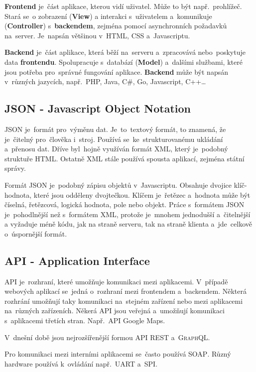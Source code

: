 \documentclass[14pt,a4paper]{article}
\begin{document}
        \textbf{Frontend} je~část aplikace, kterou vidí uživatel. Může to být např.~prohlížeč. Stará se~o zobrazení (\textbf{View}) a interakci s~uživatelem a~komunikuje (\textbf{Controller}) s~\textbf{backendem}, zejména pomocí asynchronních požadavků na~server. Je~napsán většinou v~HTML, CSS a~Javascriptu.

        \textbf{Backend} je~část aplikace, která běží na~serveru a~zpracovává nebo~poskytuje data \textbf{frontendu}. 
        Spolupracuje s~databází (\textbf{Model}) a~dalšími službami, které jsou potřeba pro~správné fungování aplikace. \textbf{Backend} může být napsán v~různých jazycích, např.~PHP, Java, C\#, Go, Javascript, C++\dots

        \subsection{JSON - Javascript Object Notation}
        JSON je~formát pro~výměnu dat. Je~to~textový formát, to znamená, že je~čitelný pro~člověka i~stroj.
        Používá se~ke~strukturovanému ukládání a~přenosu dat. Dříve byl~hojně využíván formát XML,
        který je~podobný struktuře HTML. Ostatně XML stále používá spousta aplikací, zejména státní správy.

        Formát JSON je~podobný zápisu objektů v~Javascriptu. Obsahuje dvojice klíč-hodnota, které jsou odděleny dvojtečkou.
        Klíčem je~řetězec a~hodnota může být číselná, řetězcová, logická hodnota, pole nebo objekt.
        Práce s~formátem JSON je~pohodlnější než s~formátem XML, protože je~mnohem jednodušší a~čitelnější a vyžaduje méně kódu,
        jak na straně serveru, tak na straně klienta a~jde~celkově o~úspornější formát.

        \subsection{API - Application Interface}
        API je~rozhraní, které umožňuje komunikaci mezi aplikacemi. V~případě webových aplikací se~jedná o~rozhraní mezi frontendem a~backendem.
        Některá rozhrání umožňují taky komunikaci na~stejném zařízení nebo mezi aplikacemi na~různých zařízeních.
        Někerá API jsou veřejná a~umožňují komunikaci s~aplikacemi třetích stran. Např.~API Google Maps.

        V~dnešní době jsou nejrozšířenější formou API \textsc{REST} a~\textsc{GraphQL}.

        Pro komunikaci mezi interními aplikacemi se~často používá \textsc{SOAP}. Různý hardware používá k~ovládání např.~\textsc{UART} a~\textsc{SPI}.
\end{document}
